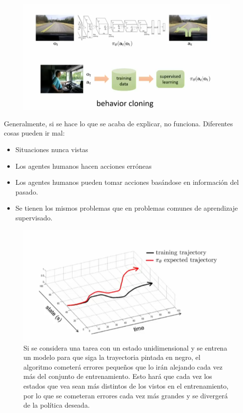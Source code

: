 \begin{figure}[htpb]
	\centering
	\includegraphics[width=0.8\linewidth]{figures/2020-06-11-131716_683x350_scrot.png}
\end{figure}

Generalmente, si se hace lo que se acaba de explicar, no funciona. Diferentes cosas
pueden ir mal:
\begin{itemize}
    \item Situaciones nunca vistas
    \item Los agentes humanos hacen acciones erróneas
    \item Los agentes humanos pueden tomar acciones basándose en información del pasado.
    \item Se tienen los mismos problemas que en problemas comunes de aprendizaje
        supervisado.
\end{itemize}

\begin{figure}[htpb]
	\centering
	\includegraphics[width=0.8\linewidth]{figures/2020-06-11-132114_579x312_scrot.png}
	\caption{Si se considera una tarea con un estado unidimensional y se entrena un modelo
    para que siga la trayectoria pintada en negro, el algoritmo cometerá errores pequeños que
lo irán alejando cada vez más del conjunto de entrenamiento. Esto hará que cada vez los estados
que vea sean más distintos de los vistos en el entrenamiento, por lo que se cometeran errores
cada vez más grandes y se divergerá de la política deseada.}
\end{figure}

